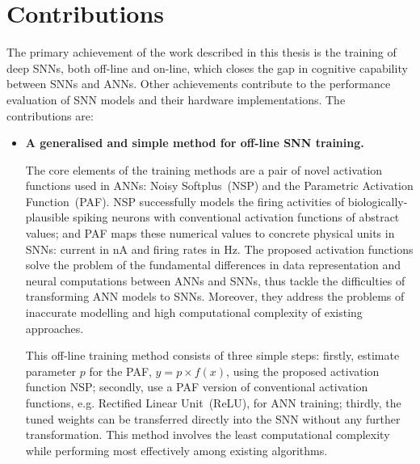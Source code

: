 \section{Contributions}
The primary achievement of the work described in this thesis is the training of deep SNNs, both off-line and on-line, which closes the gap in cognitive capability between SNNs and ANNs.
Other achievements contribute to the performance evaluation of SNN models and their hardware implementations.
The contributions are:
\begin{itemize}
%	

	\item 
	\textbf{A generalised and simple method for off-line SNN training.}


	The core elements of the training methods are a pair of novel activation functions used in ANNs: Noisy Softplus~(NSP) and the Parametric Activation Function~(PAF).
	NSP successfully models the firing activities of biologically-plausible spiking neurons with conventional activation functions of abstract values;
	and PAF maps these numerical values to concrete physical units in SNNs: current in nA and firing rates in Hz.
	The proposed activation functions solve the problem of the fundamental differences in data representation and neural computations between ANNs and SNNs, thus tackle the difficulties of transforming ANN models to SNNs.
	Moreover, they address the problems of inaccurate modelling and high computational complexity of existing approaches.

	This off-line training method consists of three simple steps: firstly, estimate parameter $p$ for the PAF, $y = p \times f(x)$, using the proposed activation function NSP; secondly, use a PAF version of conventional activation functions, e.g. Rectified Linear Unit~(ReLU), for ANN training; %
	thirdly, the tuned weights can be transferred directly into the SNN without any further transformation.
	This method involves the least computational complexity while performing most effectively among existing algorithms.


\end{itemize}

